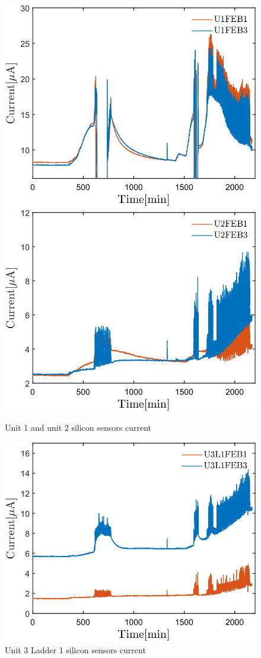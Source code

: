 \begin{figure}[h!]
\centering
\includegraphics[width=0.45\columnwidth]{Chapter6/DCS/images/uranium/U1.png}
\includegraphics[width=0.45\columnwidth]{Chapter6/DCS/images/uranium/U2.png}
\caption{Unit 1 and unit 2 silicon sensors current}
\label{fig_U1U2}
\end{figure}

\begin{figure}[h!]
\centering
\includegraphics[width=0.55\columnwidth]{Chapter6/DCS/images/uranium/U3L1.png}
\caption{Unit 3 Ladder 1 silicon sensors current}
\label{fig_U3L1}
\end{figure}

